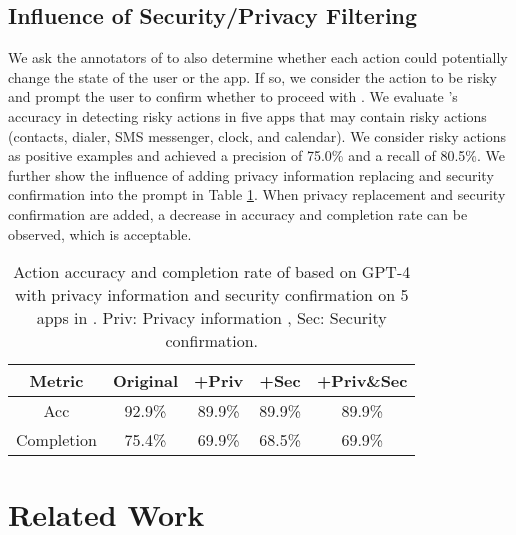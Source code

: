 \subsection{Influence of Security/Privacy Filtering}
\label{eval:security_privacy}

We ask the annotators of \datasetname to also determine whether each action could potentially change the state of the user or the app. If so, we consider the action to be risky and prompt the user to confirm whether to proceed with . We evaluate \name's accuracy in detecting risky actions in five apps that may contain risky actions (contacts, dialer, SMS messenger, clock, and calendar). We consider risky actions as positive examples and \name achieved a precision of 75.0\% and a recall of 80.5\%. We further show the influence of adding privacy information replacing and security confirmation into the prompt in Table \ref{tab:dangerous_action}. When privacy replacement and security confirmation are added, a decrease in accuracy and completion rate can be observed, which is acceptable.

    

\begin{table}
 \caption{Action accuracy and completion rate of \name based on GPT-4 with privacy information  and security confirmation on 5 apps in \datasetname. Priv: Privacy information , Sec: Security confirmation.} %
    \vspace{-0.1cm}
    \centering
    \resizebox{.35\textwidth}{!}
    {
        \begin{tabular}{ccccc}
		\toprule
		\cmidrule(r){1-2}
  
            Metric            & Original  & +Priv  & +Sec  & +Priv\&Sec    \\
		\midrule
		  Acc               &  92.9\%   &  89.9\%  &  89.9\%   &  89.9\%  \\
		Completion        &  75.4\%   &  69.9\%  &  68.5\%   &  69.9\%  \\
		\bottomrule
	\end{tabular}
	}
 \vspace{-0.4cm} 

 \label{tab:dangerous_action}
\end{table}

\section{Related Work}\label{sec:related_work}

